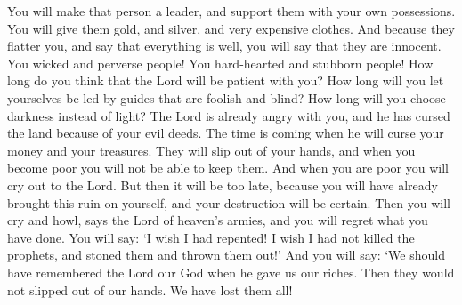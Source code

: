 You will make that person a leader, and support them with your own possessions. You will give them gold, and silver, and very expensive clothes. And because they flatter you, and say that everything is well, you will say that they are innocent.
\bverse \iffalse O ye wicked and ye perverse generation; ye hardened and ye stiffnecked people, how long will ye suppose that the Lord will suffer you? Yea, how long will ye suffer yourselves to be led by foolish and blind guides? Yea, how long will ye choose darkness rather than light? \fi
You wicked and perverse people! You hard-hearted and stubborn people! How long do you think that the Lord will be patient with you? How long will you let yourselves be led by guides that are foolish and blind? How long will you choose darkness instead of light?
\bverse \iffalse Yea, behold, the anger of the Lord is already kindled against you; behold, he hath cursed the land because of your iniquity. \fi
The Lord is already angry with you, and he has cursed the land because of your evil deeds.
\bverse \iffalse And behold, the time cometh that he curseth your riches, that they become slippery, that ye cannot hold them; and in the days of your poverty ye cannot retain them. \fi
The time is coming when he will curse your money and your treasures. They will slip out of your hands, and when you become poor you will not be able to keep them.
\bverse \iffalse And in the days of your poverty ye shall cry unto the Lord; and in vain shall ye cry, for your desolation is already come upon you, and your destruction is made sure; and then shall ye weep and howl in that day, saith the Lord of Hosts. And then shall ye lament, and say: \fi
And when you are poor you will cry out to the Lord. But then it will be too late, because you will have already brought this ruin on yourself, and your destruction will be certain. Then you will cry and howl, says the Lord of heaven's armies, and you will regret what you have done. You will say:
\bverse \iffalse O that I had repented, and had not killed the prophets, and stoned them, and cast them out. Yea, in that day ye shall say: O that we had remembered the Lord our God in the day that he gave us our riches, and then they would not have become slippery that we should lose them; for behold, our riches are gone from us. \fi
\lq I wish I had repented! I wish I had not killed the prophets, and stoned them and thrown them out!\rq{} And you will say: \lq We should have remembered the Lord our God when he gave us our riches. Then they would not slipped out of our hands. We have lost them all!
